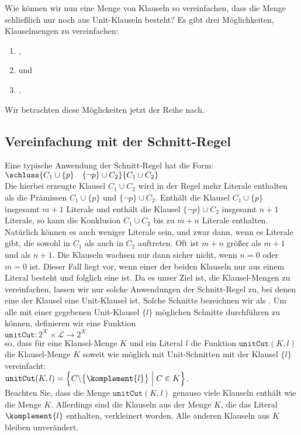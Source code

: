 Wie können wir nun eine Menge von Klauseln so vereinfachen, dass die Menge schließlich nur
noch aus Unit-Klauseln besteht?  Es gibt drei
Möglichkeiten, Klauselmengen zu vereinfachen:
\begin{enumerate}
\item {},
\item {} und
\item {}.
\end{enumerate}
Wir betrachten diese Möglickeiten jetzt der Reihe nach.

\subsection{Vereinfachung mit der Schnitt-Regel}
Eine typische Anwendung der Schnitt-Regel hat die Form: \\[0.2cm]
\hspace*{1.3cm} $\schluss{ C_1 \cup \{p\} \quad \{\neg p\} \cup C_2}{C_1 \cup C_2}$
\\[0.2cm]
Die hierbei erzeugte Klausel $C_1 \cup C_2$ wird in der Regel mehr Literale enthalten
als die Prämissen $C_1 \cup \{p\}$ und $\bigl\{\neg p\} \cup C_2$.  Enthält die
Klausel $C_1 \cup \{p\}$ insgesamt $m+1$ Literale und enthält die Klausel
$\bigl\{\neg p\} \cup C_2$ insgesamt $n+1$ Literale, so kann die Konklusion $C_1 \cup C_2$ 
bis zu $m + n$ Literale enthalten.  Natürlich können es auch weniger Literale 
sein, und zwar dann, wenn es Literale gibt, die sowohl in $C_1$ als auch in $C_2$
auftreten.  Oft ist $m + n$ größer als $m + 1$ und als $n + 1$.  Die
Klauseln wachsen nur dann sicher nicht, wenn  $n = 0$ oder $m = 0$ ist.
Dieser Fall liegt vor, wenn einer der beiden Klauseln nur aus einem Literal besteht
und folglich eine  ist.  Da es unser Ziel ist, die Klausel-Mengen
zu vereinfachen, lassen wir nur solche Anwendungen der Schnitt-Regel zu, bei denen
eine der Klausel eine Unit-Klausel ist.  Solche Schnitte bezeichnen wir als
.  Um alle mit einer gegebenen Unit-Klausel $\{l\}$ möglichen Schnitte
durchführen zu können, definieren wir eine Funktion
\\[0.2cm]
\hspace*{1.3cm}
$\texttt{unitCut}: 2^\mathcal{K} \times \mathcal{L} \rightarrow 2^\mathcal{K}$
\\[0.2cm]
so, dass für eine Klausel-Menge $K$ und ein Literal $l$ die Funktion
$\texttt{unitCut}(K,l)$ die Klausel-Menge $K$ soweit wie möglich mit Unit-Schnitten mit der Klausel
$\{l\}$ vereinfacht:
\\[0.2cm]
\hspace*{1.3cm}
$\texttt{unitCut}(K,l) = \Bigl\{ C \backslash \bigl\{ \komplement{l} \bigr\} \;\Big|\; C \in K \Bigr\}$.
\\[0.2cm]
Beachten Sie, dass die Menge $\texttt{unitCut}(K,l)$ genauso viele Klauseln enthält wie die Menge
$K$.  Allerdings sind die Klauseln aus der Menge $K$, die das Literal $\komplement{l}$
enthalten, verkleinert worden.   Alle anderen Klauseln aus $K$ bleiben unverändert.

